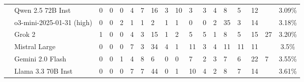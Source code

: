 \begin{table*}[t]
\begin{tabular}{l|p{0.45cm}p{0.45cm}p{0.45cm}p{0.45cm}p{0.45cm}p{0.45cm}|p{0.45cm}p{0.45cm}p{0.45cm}|l|p{0.45cm}p{0.45cm}p{0.45cm}|l|p{0.45cm}|c}
\ \ Qwen 2.5 72B Inst & \cellcolor{ReliableGreen}0 & \cellcolor{ReliableGreen}0 & \cellcolor{ReliableGreen}0 & \cellcolor{ReliableYellow}4 & \cellcolor{ReliableOrange}7 & 16 & \cellcolor{ReliableYellow}3 & 10 & \cellcolor{ReliableYellow}3 & \cellcolor{ReliableYellow}3 & \cellcolor{ReliableOrange}4 & \cellcolor{ReliableOrange}8 & \cellcolor{ReliableOrange}5 & 12 &  & \cellcolor{ReliableGray}3.09\% \\
\ \ o3-mini-2025-01-31 (high) & \cellcolor{ReliableGreen}0 & \cellcolor{ReliableGreen}0 & \cellcolor{ReliableYellow}2 & \cellcolor{ReliableYellow}1 & \cellcolor{ReliableYellow}1 & \cellcolor{ReliableYellow}2 & \cellcolor{ReliableYellow}1 & \cellcolor{ReliableYellow}1 & \cellcolor{ReliableGreen}0 & \cellcolor{ReliableGreen}0 & \cellcolor{ReliableYellow}2 & 35 & \cellcolor{ReliableYellow}3 & 14 &  & \cellcolor{ReliableGray}3.18\% \\
\ \ Grok 2 & \cellcolor{ReliableYellow}1 & \cellcolor{ReliableGreen}0 & \cellcolor{ReliableGreen}0 & \cellcolor{ReliableYellow}4 & \cellcolor{ReliableYellow}3 & 15 & \cellcolor{ReliableYellow}1 & \cellcolor{ReliableYellow}2 & \cellcolor{ReliableOrange}5 & \cellcolor{ReliableOrange}5 & \cellcolor{ReliableYellow}1 & \cellcolor{ReliableOrange}8 & \cellcolor{ReliableOrange}5 & 15 & 27 & \cellcolor{ReliableGray}3.20\% \\
\ \ Mistral Large & \cellcolor{ReliableGreen}0 & \cellcolor{ReliableGreen}0 & \cellcolor{ReliableGreen}0 & \cellcolor{ReliableOrange}7 & \cellcolor{ReliableYellow}3 & 34 & \cellcolor{ReliableYellow}4 & \cellcolor{ReliableYellow}1 & 11 & \cellcolor{ReliableYellow}3 & \cellcolor{ReliableOrange}4 & 11 & 11 & 11 &  & \cellcolor{ReliableGray}3.5\% \\
\ \ Gemini 2.0 Flash & \cellcolor{ReliableGreen}0 & \cellcolor{ReliableGreen}0 & \cellcolor{ReliableYellow}1 & \cellcolor{ReliableYellow}4 & \cellcolor{ReliableOrange}8 & \cellcolor{ReliableOrange}6 & \cellcolor{ReliableGreen}0 & \cellcolor{ReliableGreen}0 & \cellcolor{ReliableOrange}7 & \cellcolor{ReliableYellow}2 & \cellcolor{ReliableYellow}3 & \cellcolor{ReliableOrange}7 & \cellcolor{ReliableOrange}6 & 22 & \cellcolor{ReliableOrange}7 & \cellcolor{ReliableGray}3.55\% \\
\ \ Llama 3.3 70B Inst & \cellcolor{ReliableGreen}0 & \cellcolor{ReliableGreen}0 & \cellcolor{ReliableGreen}0 & \cellcolor{ReliableOrange}7 & \cellcolor{ReliableOrange}7 & 44 & \cellcolor{ReliableGreen}0 & \cellcolor{ReliableYellow}1 & \cellcolor{ReliableOrange}10 & \cellcolor{ReliableOrange}4 & \cellcolor{ReliableYellow}2 & \cellcolor{ReliableOrange}8 & \cellcolor{ReliableOrange}7 & 14 &  & \cellcolor{ReliableGray}3.61\% \\

\end{tabular}
\end{table*}
